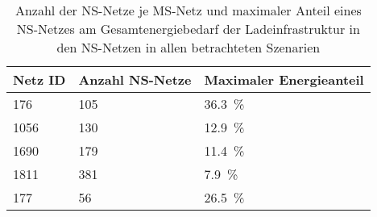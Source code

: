 {
\renewcommand{\arraystretch}{1.2}%
\begin{table}[H]
	\begin{center}
		\caption{Anzahl der NS-Netze je MS-Netz und maximaler Anteil eines NS-Netzes am Gesamtenergiebedarf der Ladeinfrastruktur in den NS-Netzen in allen betrachteten Szenarien}
		\begin{tabu} to 0.6\textwidth {X[0.5] X[1.1, r] X[1.5, r]}
			\toprule
			Netz ID    & Anzahl NS-Netze & Maximaler Energieanteil 			\\ \midrule
			\num{176}  & \num{105}       & \SI{36.3}{\percent}              \\
			\num{1056} & \num{130}       & \SI{12.9}{\percent}              \\
			\num{1690} & \num{179}       & \SI{11.4}{\percent}              \\
			\num{1811} & \num{381}       & \SI{7.9}{\percent}               \\
			\num{177}  & \num{56}        & \SI{26.5}{\percent}              \\ \bottomrule
		\end{tabu}
		\label{tab:largestLVGridShare}
	\end{center}
	\vspace{-3mm}%
\end{table}
}